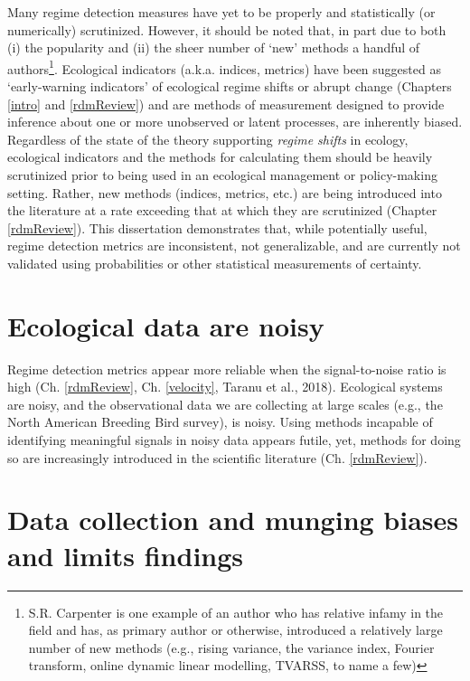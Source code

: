 \documentclass[12pt,twoside,openany]{reedthesis}
\begin{document}
Many regime detection measures have yet to be properly and statistically (or numerically) scrutinized. However, it should be noted that, in part due to both (i) the popularity and (ii) the sheer number of `new' methods a handful of authors\footnote{S.R. Carpenter is one example of an author who has relative infamy in the field and has, as primary author or otherwise, introduced a relatively large number of new methods (e.g., rising variance, the variance index, Fourier transform, online dynamic linear modelling, TVARSS, to name a few)}. Ecological indicators (a.k.a. indices, metrics) have been suggested as `early-warning indicators' of ecological regime shifts or abrupt change (Chapters \ref{intro} and \ref{rdmReview}) and are methods of measurement designed to provide inference about one or more unobserved or latent processes, are inherently biased. Regardless of the state of the theory supporting \emph{regime shifts} in ecology, ecological indicators and the methods for calculating them should be heavily scrutinized prior to being used in an ecological management or policy-making setting. Rather, new methods (indices, metrics, etc.) are being introduced into the literature at a rate exceeding that at which they are scrutinized (Chapter \ref{rdmReview}). This dissertation demonstrates that, while potentially useful, regime detection metrics are inconsistent, not generalizable, and are currently not validated using probabilities or other statistical measurements of certainty.

\hypertarget{ecological-data-are-noisy}{%
\section{Ecological data are noisy}\label{ecological-data-are-noisy}}

Regime detection metrics appear more reliable when the signal-to-noise ratio is high (Ch. \ref{rdmReview}, Ch. \ref{velocity}, Taranu et al., 2018). Ecological systems are noisy, and the observational data we are collecting at large scales (e.g., the North American Breeding Bird survey), is noisy. Using methods incapable of identifying meaningful signals in noisy data appears futile, yet, methods for doing so are increasingly introduced in the scientific literature (Ch. \ref{rdmReview}).

\hypertarget{data-collection-and-munging-biases-and-limits-findings}{%
\section{Data collection and munging biases and limits findings}\label{data-collection-and-munging-biases-and-limits-findings}}
\end{document}
